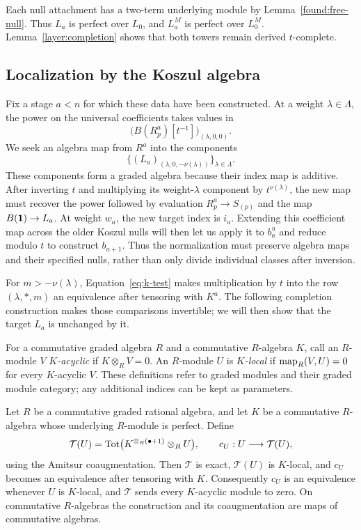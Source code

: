 Each null attachment has a two-term underlying module by
Lemma~\ref{found:free-null}.  Thus $L_a$ is perfect over $L_0$, and
$L_a^M$ is perfect over $L_0^M$.  Lemma~\ref{layer:completion} shows
that both towers remain derived $t$-complete.

\subsection{Localization by the Koszul algebra}

Fix a stage $a<n$ for which these data have been constructed.
At a weight $\lambda\in\Lambda$, the power on the universal
coefficients takes values in
\[
 \bigl(B(R_p^a)[t^{-1}]\bigr)_{(\lambda,0,0)}.
\]
We seek an algebra map from $R^a$ into the components
\[
 \bigl\{(L_a)_{(\lambda,0,-\nu(\lambda))}\bigr\}_{\lambda\in\Lambda}.
\]
These components form a graded algebra because their index map is
additive. After inverting $t$ and multiplying its weight-$\lambda$
component by $t^{\nu(\lambda)}$, the new map must recover the power
followed by evaluation $R_p^a\to S_{(p)}$ and the map
$B(\mathbf 1)\to L_a$. At weight $w_a$, the new target index is $i_a$.
Extending this coefficient map across the older Koszul nulls will
then let us apply it to $b_a^u$ and reduce modulo $t$ to construct
$b_{a+1}$. Thus the normalization must preserve algebra maps and
their specified nulls, rather than only divide individual classes
after inversion.

For $m>-\nu(\lambda)$, Equation~\eqref{eq:k-test} makes multiplication
by $t$ into the row $(\lambda,*,m)$ an equivalence after tensoring
with $K^a$. The following completion construction makes those
comparisons invertible; we will then show that the target $L_a$ is
unchanged by it.

For a commutative graded algebra $R$ and a commutative
$R$-algebra $K$, call an $R$-module $V$ \emph{$K$-acyclic} if
$K\otimes_R V=0$.  An $R$-module $U$ is \emph{$K$-local} if
$\operatorname{map}_R(V,U)=0$ for every $K$-acyclic $V$.  These definitions refer
to graded modules and their graded module category; any additional
indices can be kept as parameters.

\begin{lemma}
\label{norm:amitsur}
Let $R$ be a commutative graded rational algebra, and let $K$ be a
commutative $R$-algebra whose underlying $R$-module is perfect.  Define
\[
 \mathcal T(U)=
 \operatorname{Tot}\bigl(K^{\otimes_R(\bullet+1)}\otimes_R U\bigr),
 \qquad c_U:U\longrightarrow\mathcal T(U),
\]
using the Amitsur coaugmentation.  Then $\mathcal T$ is exact,
$\mathcal T(U)$ is $K$-local, and $c_U$ becomes an equivalence after
tensoring with $K$.  Consequently $c_U$ is an equivalence whenever
$U$ is $K$-local, and $\mathcal T$ sends every $K$-acyclic module to
zero.  On commutative $R$-algebras the construction and its
coaugmentation are maps of commutative algebras.
\end{lemma}

